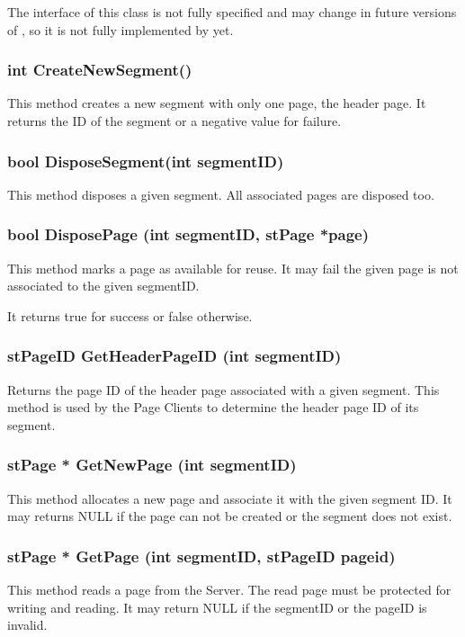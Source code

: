 The interface of this class is not fully specified and may change in future versions of \libname, so it is not fully implemented by \libname{ }yet.

\subsubsection{int CreateNewSegment()}
This method creates a new segment with only one page, the header page. It returns the ID of the segment or a negative value for failure.

\subsubsection{bool DisposeSegment(int segmentID)}
This method disposes a given segment. All associated pages are disposed too.

\subsubsection{bool DisposePage (int segmentID, stPage *page)}
This method marks a page as available for reuse. It may fail the given page is not associated to the given segmentID.

It returns true for success or false otherwise.

\subsubsection{stPageID GetHeaderPageID (int segmentID)}
Returns the page ID of the header page associated with a given segment. This method is used by the Page Clients to determine the header page ID of its segment.

\subsubsection{stPage * GetNewPage (int segmentID)}
This method allocates a new page and associate it with the given segment ID. It may returns NULL if the page can not be created or the segment does not exist.

\subsubsection{stPage * GetPage (int segmentID, stPageID pageid)}
This method reads a page from the Server. The read page must be protected for writing and reading. It may return NULL if the segmentID or the pageID is invalid.

